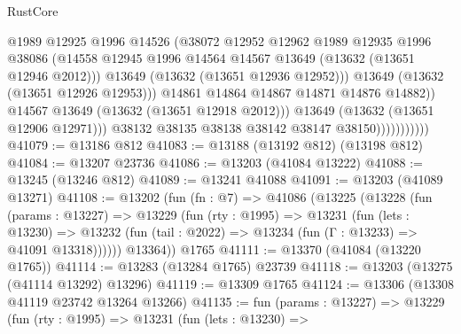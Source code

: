 \begin{lexlean}{RustCore}
\begin{coremodule}
                                    @1989
                                    @12925
                                    @1996
                                    @14526
                                    (@38072
                                      @12952
                                      @12962
                                      @1989
                                      @12935
                                      @1996
                                      @38086
                                      (@14558
                                        @12945
                                        @1996
                                        @14564
                                        @14567
                                        @13649
                                        (@13632 (@13651 @12946 @2012)))
                                      @13649
                                      (@13632 (@13651 @12936 @12952)))
                                    @13649
                                    (@13632 (@13651 @12926 @12953)))
                                  @14861
                                  @14864
                                  @14867
                                  @14871
                                  @14876
                                  @14882))
                              @14567
                              @13649
                              (@13632 (@13651 @12918 @2012)))
                            @13649
                            (@13632 (@13651 @12906 @12971)))
                          @38132
                          @38135
                          @38138
                          @38142
                          @38147
                          @38150)))))))))))
@41079 := @13186 @812
@41083 := @13188 (@13192 @812) (@13198 @812)
@41084 := @13207 @23736
@41086 := @13203 (@41084 @13222)
@41088 := @13245 (@13246 @812)
@41089 := @13241 @41088
@41091 := @13203 (@41089 @13271)
@41108 := @13202
    (fun (fn : @7) =>
    @41086
      (@13225
        (@13228
          (fun (params : @13227) =>
          @13229
            (fun (rty : @1995) =>
            @13231
              (fun (lets : @13230) =>
              @13232 (fun (tail : @2022) => @13234 (fun (Γ : @13233) => @41091 @13318))))))
        @13364))
    @1765
@41111 := @13370 (@41084 (@13220 @1765))
@41114 := @13283 (@13284 @1765) @23739
@41118 := @13203 (@13275 (@41114 @13292) @13296)
@41119 := @13309 @1765
@41124 := @13306 (@13308 @41119 @23742 @13264 @13266)
@41135 := fun (params : @13227) =>
  @13229
    (fun (rty : @1995) =>
    @13231
      (fun (lets : @13230) =>

\end{coremodule}
\end{lexlean}

